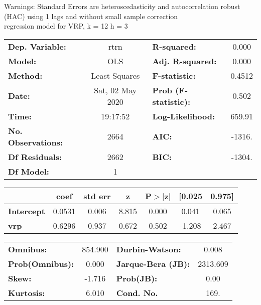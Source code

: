 Warnings: \newline
 [1] Standard Errors are heteroscedasticity and autocorrelation robust (HAC) using 1 lags and without small sample correction\\ 

regression model for VRP, k = 12 h = 3\begin{center}
\begin{tabular}{lclc}
\toprule
\textbf{Dep. Variable:}    &       rtrn       & \textbf{  R-squared:         } &     0.000   \\
\textbf{Model:}            &       OLS        & \textbf{  Adj. R-squared:    } &     0.000   \\
\textbf{Method:}           &  Least Squares   & \textbf{  F-statistic:       } &    0.4512   \\
\textbf{Date:}             & Sat, 02 May 2020 & \textbf{  Prob (F-statistic):} &    0.502    \\
\textbf{Time:}             &     19:17:52     & \textbf{  Log-Likelihood:    } &    659.91   \\
\textbf{No. Observations:} &        2664      & \textbf{  AIC:               } &    -1316.   \\
\textbf{Df Residuals:}     &        2662      & \textbf{  BIC:               } &    -1304.   \\
\textbf{Df Model:}         &           1      & \textbf{                     } &             \\
\bottomrule
\end{tabular}
\begin{tabular}{lcccccc}
                   & \textbf{coef} & \textbf{std err} & \textbf{z} & \textbf{P$> |$z$|$} & \textbf{[0.025} & \textbf{0.975]}  \\
\midrule
\textbf{Intercept} &       0.0531  &        0.006     &     8.815  &         0.000        &        0.041    &        0.065     \\
\textbf{vrp}       &       0.6296  &        0.937     &     0.672  &         0.502        &       -1.208    &        2.467     \\
\bottomrule
\end{tabular}
\begin{tabular}{lclc}
\textbf{Omnibus:}       & 854.900 & \textbf{  Durbin-Watson:     } &    0.008  \\
\textbf{Prob(Omnibus):} &   0.000 & \textbf{  Jarque-Bera (JB):  } & 2313.609  \\
\textbf{Skew:}          &  -1.716 & \textbf{  Prob(JB):          } &     0.00  \\
\textbf{Kurtosis:}      &   6.010 & \textbf{  Cond. No.          } &     169.  \\
\bottomrule
\end{tabular}
\end{center}

